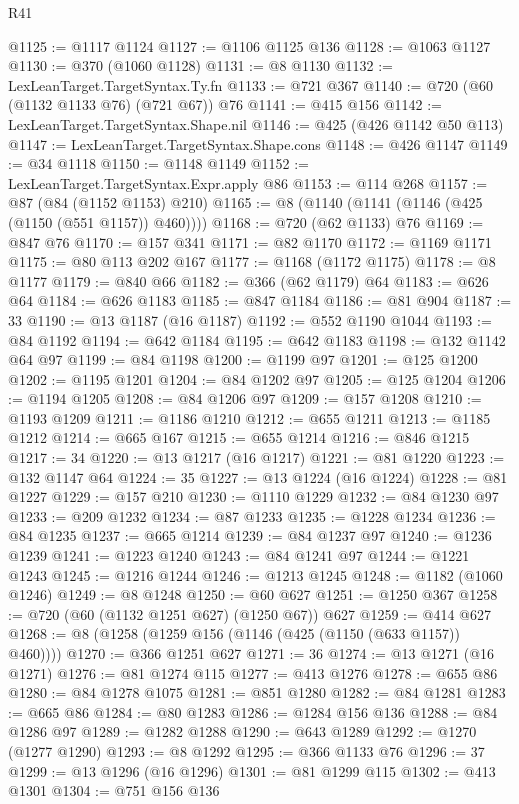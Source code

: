 \begin{lexlean}{R41}
\begin{coremodule}
@1125 := @1117 @1124
@1127 := @1106 @1125 @136
@1128 := @1063 @1127
@1130 := @370 (@1060 @1128)
@1131 := @8 @1130
@1132 := LexLeanTarget.TargetSyntax.Ty.fn
@1133 := @721 @367
@1140 := @720 (@60 (@1132 @1133 @76) (@721 @67)) @76
@1141 := @415 @156
@1142 := LexLeanTarget.TargetSyntax.Shape.nil
@1146 := @425 (@426 @1142 @50 @113)
@1147 := LexLeanTarget.TargetSyntax.Shape.cons
@1148 := @426 @1147
@1149 := @34 @1118
@1150 := @1148 @1149
@1152 := LexLeanTarget.TargetSyntax.Expr.apply @86
@1153 := @114 @268
@1157 := @87 (@84 (@1152 @1153) @210)
@1165 := @8 (@1140 (@1141 (@1146 (@425 (@1150 (@551 @1157)) @460))))
@1168 := @720 (@62 @1133) @76
@1169 := @847 @76
@1170 := @157 @341
@1171 := @82 @1170
@1172 := @1169 @1171
@1175 := @80 @113 @202 @167
@1177 := @1168 (@1172 @1175)
@1178 := @8 @1177
@1179 := @840 @66
@1182 := @366 (@62 @1179) @64
@1183 := @626 @64
@1184 := @626 @1183
@1185 := @847 @1184
@1186 := @81 @904
@1187 := 33
@1190 := @13 @1187 (@16 @1187)
@1192 := @552 @1190 @1044
@1193 := @84 @1192
@1194 := @642 @1184
@1195 := @642 @1183
@1198 := @132 @1142 @64 @97
@1199 := @84 @1198
@1200 := @1199 @97
@1201 := @125 @1200
@1202 := @1195 @1201
@1204 := @84 @1202 @97
@1205 := @125 @1204
@1206 := @1194 @1205
@1208 := @84 @1206 @97
@1209 := @157 @1208
@1210 := @1193 @1209
@1211 := @1186 @1210
@1212 := @655 @1211
@1213 := @1185 @1212
@1214 := @665 @167
@1215 := @655 @1214
@1216 := @846 @1215
@1217 := 34
@1220 := @13 @1217 (@16 @1217)
@1221 := @81 @1220
@1223 := @132 @1147 @64
@1224 := 35
@1227 := @13 @1224 (@16 @1224)
@1228 := @81 @1227
@1229 := @157 @210
@1230 := @1110 @1229
@1232 := @84 @1230 @97
@1233 := @209 @1232
@1234 := @87 @1233
@1235 := @1228 @1234
@1236 := @84 @1235
@1237 := @665 @1214
@1239 := @84 @1237 @97
@1240 := @1236 @1239
@1241 := @1223 @1240
@1243 := @84 @1241 @97
@1244 := @1221 @1243
@1245 := @1216 @1244
@1246 := @1213 @1245
@1248 := @1182 (@1060 @1246)
@1249 := @8 @1248
@1250 := @60 @627
@1251 := @1250 @367
@1258 := @720 (@60 (@1132 @1251 @627) (@1250 @67)) @627
@1259 := @414 @627
@1268 := @8 (@1258 (@1259 @156 (@1146 (@425 (@1150 (@633 @1157)) @460))))
@1270 := @366 @1251 @627
@1271 := 36
@1274 := @13 @1271 (@16 @1271)
@1276 := @81 @1274 @115
@1277 := @413 @1276
@1278 := @655 @86
@1280 := @84 @1278 @1075
@1281 := @851 @1280
@1282 := @84 @1281
@1283 := @665 @86
@1284 := @80 @1283
@1286 := @1284 @156 @136
@1288 := @84 @1286 @97
@1289 := @1282 @1288
@1290 := @643 @1289
@1292 := @1270 (@1277 @1290)
@1293 := @8 @1292
@1295 := @366 @1133 @76
@1296 := 37
@1299 := @13 @1296 (@16 @1296)
@1301 := @81 @1299 @115
@1302 := @413 @1301
@1304 := @751 @156 @136

\end{coremodule}
\end{lexlean}
